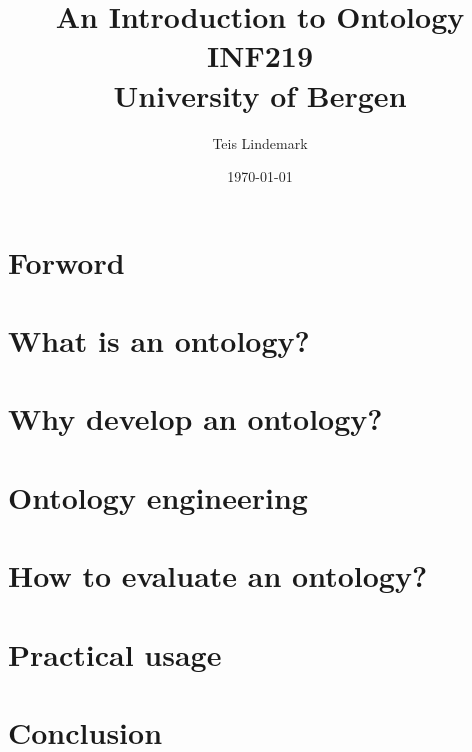 \documentclass[a4paper, english, 12pt]{article}
\title{An Introduction to Ontology\\ INF219\\ University of Bergen}
\date{\today}
\author{Teis Lindemark}
\begin{document}
\maketitle{}
\tableofcontents{}
\pagebreak


\section{Forword}


\section{What is an ontology?}


\section{Why develop an ontology?}


\section{Ontology engineering}


\section{How to evaluate an ontology?}


\section{Practical usage}


\section{Conclusion}




\end{document}
